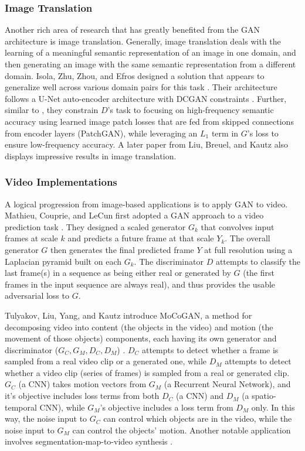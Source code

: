 \documentclass[11pt]{article}
\begin{document}
\subsubsection{Image Translation}

Another rich area of research that has greatly benefited from the GAN architecture is image translation.  Generally, image translation deals with the learning of a meaningful semantic representation of an image in one domain, and then generating an image with the same semantic representation from a different domain.  Isola, Zhu, Zhou, and Efros designed a solution that appears to generalize well across various domain pairs for this task \cite{isola2017image}.  Their architecture follows a U-Net auto-encoder architecture \cite{ronneberger2015u} with DCGAN constraints \cite{salimans2016improved}.  Further, similar to \cite{pathakCVPR16context}, they constrain $D$'s task to focusing on high-frequency semantic accuracy using learned image patch losses that are fed from skipped connections from encoder layers (PatchGAN), while leveraging an $L_1$ term in $G$'s loss to ensure low-frequency accuracy.  A later paper from Liu, Breuel, and Kautz also displays impressive results \cite{NIPS2017_6672} in image translation.

\subsubsection{Video Implementations}

A logical progression from image-based applications is to apply GAN to video.  Mathieu, Couprie, and LeCun first adopted a GAN approach to a video prediction task \cite{Mathieu2015DeepMV}.  They designed a scaled generator $G_k$ that convolves input frames at scale $k$ and predicts a future frame at that scale $Y_k$.  The overall generator $G$ then generates the final predicted frame $Y$ at full resolution using a Laplacian pyramid \cite{denton2015deep} built on each $G_k$.  The discriminator $D$ attempts to classify the last frame(s) in a sequence as being either real or generated by $G$ (the first frames in the input sequence are always real), and thus provides the usable adversarial loss to $G$.

Tulyakov, Liu, Yang, and Kautz introduce MoCoGAN, a method for decomposing video into content (the objects in the video) and motion (the movement of those objects) components, each having its own generator and discriminator ($G_C, G_M, D_C, D_M$) \cite{tulyakov2017mocogan}.  $D_C$ attempts to detect whether a frame is sampled from a real video clip or a generated one, while $D_M$ attempts to detect whether a video clip (series of frames) is sampled from a real or generated clip.  $G_C$ (a CNN) takes motion vectors from $G_M$ (a Recurrent Neural Network), and it's objective includes loss terms from both $D_C$ (a CNN) and $D_M$ (a spatio-temporal CNN), while $G_M$'s objective includes a loss term from $D_M$ only.  In this way, the noise input to $G_C$ can control which objects are in the video, while the noise input to $G_M$ can control the objects' motion.  Another notable application involves segmentation-map-to-video synthesis \cite{wang2018videotovideo}.
\end{document}
